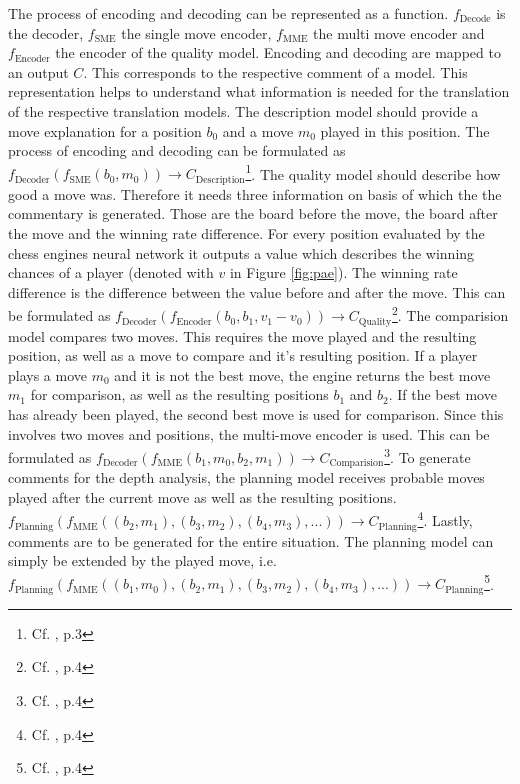 The process of encoding and decoding can be represented as a function. $f_{\text{Decode}}$ is the decoder, $f_{\text{SME}}$ the single move encoder, $f_{\text{MME}}$ the multi move encoder and $f_{\text{Encoder}}$ the encoder of the quality model. Encoding and decoding are mapped to an output $C$. This corresponds to the respective comment of a model. This representation helps to understand what information is needed for the translation of the respective translation models. The description model should provide a move explanation for a position $b_0$ and a move $m_0$ played in this position. The process of encoding and decoding can be formulated as $f_{\text{Decoder}}(f_{\text{SME}}(b_0,m_0)) \rightarrow C_{\text{Description}}$\footnote{Cf. \citep{zang-etal-2019-automated}, p.3}. The quality model should describe how good a move was. Therefore it needs three information on basis of which the the commentary is generated. Those are the board before the move, the board after the move and the winning rate difference. For every position evaluated by the chess engines neural network it outputs a value which describes the winning chances of a player (denoted with $v$ in Figure \ref{fig:pae}). The winning rate difference is the difference between the value before and after the move. This can be formulated as $f_{\text{Decoder}}(f_{\text{Encoder}}(b_0,b_1,v_1-v_0)) \rightarrow C_{\text{Quality}}$\footnote{Cf. \citep{zang-etal-2019-automated}, p.4}. The comparision model compares two moves. This requires the move played and the resulting position, as well as a move to compare and it's resulting position. If a player plays a move $m_0$ and it is not the best move, the engine returns the best move $m_1$ for comparison, as well as the resulting positions $b_1$ and $b_2$. If the best move has already been played, the second best move is used for comparison. Since this involves two moves and positions, the multi-move encoder is used. This can be formulated as $f_{\text{Decoder}}(f_{\text{MME}}(b_1,m_0,b_2,m_1)) \rightarrow C_{\text{Comparision}}$\footnote{Cf. \citep{zang-etal-2019-automated}, p.4}. To generate comments for the depth analysis, the planning model receives probable moves played after the current move as well as the resulting positions. $f_{\text{Planning}}(f_{\text{MME}}((b_2,m_1),(b_3,m_2),(b_4,m_3),...)) \rightarrow C_{\text{Planning}}$\footnote{Cf. \citep{zang-etal-2019-automated}, p.4}. Lastly, comments are to be generated for the entire situation. The planning model can simply be extended by the played move, i.e. $f_{\text{Planning}}(f_{\text{MME}}((b_1,m_0),(b_2,m_1),(b_3,m_2),(b_4,m_3),...)) \rightarrow C_{\text{Planning}}$\footnote{Cf. \citep{zang-etal-2019-automated}, p.4}.

